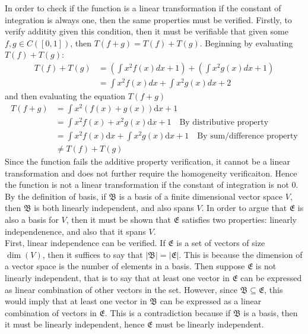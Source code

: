 \documentclass{report}
\begin{document}
\noindent In order to check if the function is a linear transformation if the constant of integration is always one, then the same properties must be verified. Firstly, to verify additity given this condition, then it must be verifiable that given some $f,g\in C([0,1])$, then $T(f+g) = T(f) + T(g)$. Beginning by evaluating $T(f) + T(g)$:
$$
\begin{aligned}
	T(f) + T(g) & = (\int{x^2f(x)dx} + 1) + (\int{x^2g(x)dx} + 1) \\
	& = \int{x^2f(x)dx} + \int{x^2g(x)dx} + 2
\end{aligned}
$$
and then evaluating the equation $T(f+g)$
$$
\begin{aligned}
	T(f+g) & = \int{x^2(f(x) + g(x))\mathrm{d}x} + 1 \\
	& = \int{x^2f(x) + x^2g(x)\mathrm{d}x} + 1\quad\text{By distributive property} \\
	& = \int{x^2f(x)\mathrm{d}x} + \int{x^2g(x)\mathrm{d}x} + 1\quad\text{By sum/difference property} \\
	& \neq T(f) + T(g)
\end{aligned}
$$
Since the function fails the additive property verification, it cannot be a linear transformation and does not further require the homogeneity verificaiton. Hence the function is not a linear transformation if the constant of integration is not 0.
\sol By the definition of basis, if $\mathfrak{B}$ is a basis of a finite dimensional vector space $V$, then $\mathfrak{B}$ is both linearly independent, and also spans $V$. In order to argue that $\mathfrak{E}$ is also a basis for $V$, then it must be shown that $\mathfrak{E}$ satisfies two properties: linearly independenence, and also that it spans $V$. \\

\noindent First, linear independence can be verified. If $\mathfrak{E}$ is a set of vectors of size $\operatorname{dim}(V)$, then it suffices to say that $|\mathfrak{B}| = |\mathfrak{E}|$. This is because the dimension of a vector space is the number of elements in a basis. Then suppose $\mathfrak{E}$ is not linearly independent, that is to say that at least one vector in $\mathfrak{E}$ can be expressed as linear combination of other vectors in the set. However, since $\mathfrak{B}\subseteq\mathfrak{E}$, this would imply that at least one vector in $\mathfrak{B}$ can be expressed as a linear combination of vectors in $\mathfrak{E}$. This is a contradiction because if $\mathfrak{B}$ is a basis, then it must be linearly independent, hence $\mathfrak{E}$ must be linearly independent. \\
\end{document}
